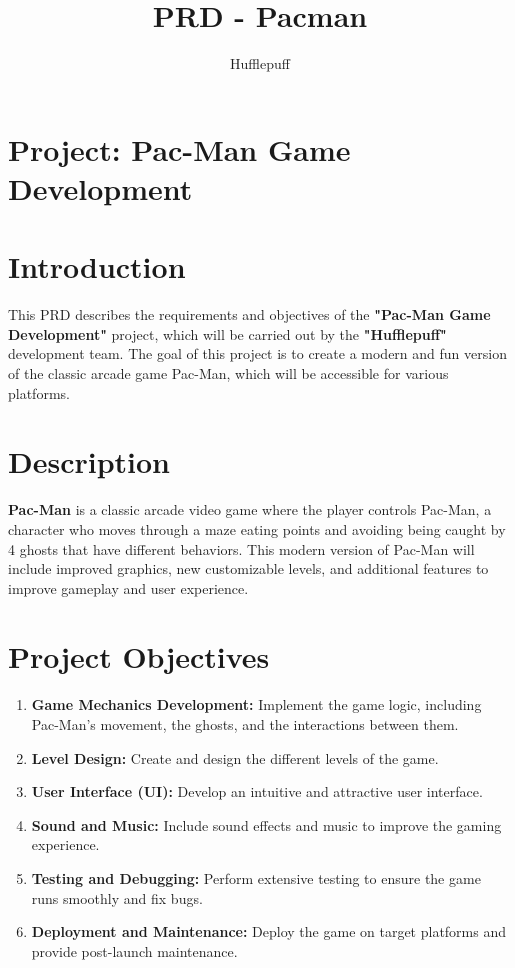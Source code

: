 \documentclass{article}
\title{PRD - Pacman}
\author{Hufflepuff}
\begin{document}
\maketitle

\section*{Project: Pac-Man Game Development}

\section*{Introduction}
This PRD describes the requirements and objectives of the \textbf{"Pac-Man Game Development"} project, which will be carried out by the \textbf{"Hufflepuff"} development team. The goal of this project is to create a modern and fun version of the classic arcade game Pac-Man, which will be accessible for various platforms.

\section*{Description}
\textbf{Pac-Man} is a classic arcade video game where the player controls Pac-Man, a character who moves through a maze eating points and avoiding being caught by 4 ghosts that have different behaviors. This modern version of Pac-Man will include improved graphics, new customizable levels, and additional features to improve gameplay and user experience.


\section*{Project Objectives}
\begin{enumerate}
    \item \textbf{Game Mechanics Development:} Implement the game logic, including Pac-Man's movement, the ghosts, and the interactions between them.
    \item \textbf{Level Design:} Create and design the different levels of the game.
    \item \textbf{User Interface (UI):} Develop an intuitive and attractive user interface.
    \item \textbf{Sound and Music:} Include sound effects and music to improve the gaming experience.
    \item \textbf{Testing and Debugging:} Perform extensive testing to ensure the game runs smoothly and fix bugs.
    \item \textbf{Deployment and Maintenance:} Deploy the game on target platforms and provide post-launch maintenance.
\end{enumerate}
\end{document}
